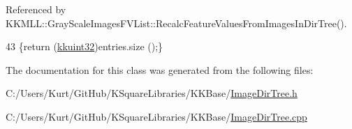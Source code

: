 Referenced by K\+K\+M\+L\+L\+::\+Gray\+Scale\+Images\+F\+V\+List\+::\+Recalc\+Feature\+Values\+From\+Images\+In\+Dir\+Tree().


\begin{DoxyCode}
43 \{\textcolor{keywordflow}{return}  (\hyperlink{namespace_k_k_b_af8d832f05c54994a1cce25bd5743e19a}{kkuint32})entries.size ();\}
\end{DoxyCode}


The documentation for this class was generated from the following files\+:\begin{DoxyCompactItemize}
\item 
C\+:/\+Users/\+Kurt/\+Git\+Hub/\+K\+Square\+Libraries/\+K\+K\+Base/\hyperlink{_image_dir_tree_8h}{Image\+Dir\+Tree.\+h}\item 
C\+:/\+Users/\+Kurt/\+Git\+Hub/\+K\+Square\+Libraries/\+K\+K\+Base/\hyperlink{_image_dir_tree_8cpp}{Image\+Dir\+Tree.\+cpp}\end{DoxyCompactItemize}
